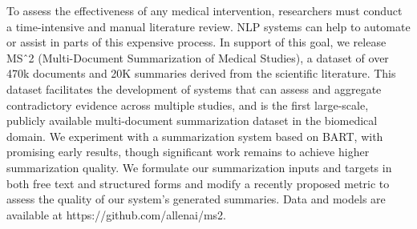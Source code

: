 To assess the effectiveness of any medical intervention, researchers must conduct a time-intensive and manual literature review. NLP systems can help to automate or assist in parts of this expensive process. In support of this goal, we release MSˆ2 (Multi-Document Summarization of Medical Studies), a dataset of over 470k documents and 20K summaries derived from the scientific literature. This dataset facilitates the development of systems that can assess and aggregate contradictory evidence across multiple studies, and is the first large-scale, publicly available multi-document summarization dataset in the biomedical domain. We experiment with a summarization system based on BART, with promising early results, though significant work remains to achieve higher summarization quality. We formulate our summarization inputs and targets in both free text and structured forms and modify a recently proposed metric to assess the quality of our system's generated  summaries. Data and models are available at https://github.com/allenai/ms2.
